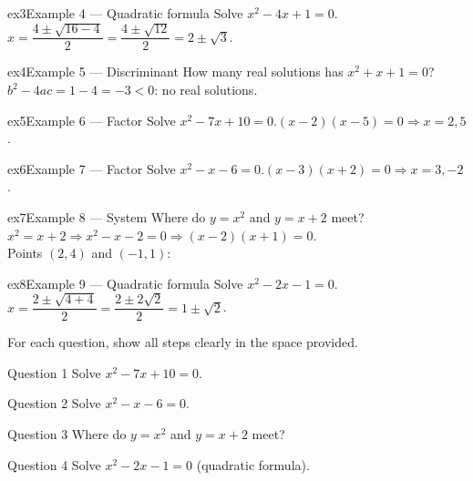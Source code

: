 \documentclass[11pt]{article}
\begin{document}
\begin{example}{ex3}{Example 4 --- Quadratic formula}
Solve $x^2-4x+1=0$.\soln $x=\dfrac{4\pm\sqrt{16-4}}{2}=\dfrac{4\pm\sqrt{12}}{2}=2\pm\sqrt3$.
\end{example}

\begin{example}{ex4}{Example 5 --- Discriminant}
How many real solutions has $x^2+x+1=0$?\soln $b^2-4ac=1-4=-3<0$: no real solutions.
\end{example}

\begin{example}{ex5}{Example 6 --- Factor}
Solve $x^2-7x+10=0$.\soln $(x-2)(x-5)=0\Rightarrow x=2,5$.
\end{example}

\begin{example}{ex6}{Example 7 --- Factor}
Solve $x^2-x-6=0$.\soln $(x-3)(x+2)=0\Rightarrow x=3,-2$.
\end{example}

\begin{example}{ex7}{Example 8 --- System}
Where do $y=x^2$ and $y=x+2$ meet?\soln $x^2=x+2\Rightarrow x^2-x-2=0\Rightarrow(x-2)(x+1)=0$. \\ Points $(2,4)$ and $(-1,1)$:
\end{example}

\begin{example}{ex8}{Example 9 --- Quadratic formula}
Solve $x^2-2x-1=0$.\soln $x=\dfrac{2\pm\sqrt{4+4}}{2}=\dfrac{2\pm2\sqrt2}{2}=1\pm\sqrt2$.
\end{example}

\clearpage
{}
For each question, show all steps clearly in the space provided.

\begin{qbox}{Question 1}
Solve $x^2-7x+10=0$.\workspace{2.4cm}
\end{qbox}

\begin{qbox}{Question 2}
Solve $x^2-x-6=0$.\workspace{2.4cm}
\end{qbox}

\begin{qbox}{Question 3}
Where do $y=x^2$ and $y=x+2$ meet?\workspace{2.4cm}
\end{qbox}

\begin{qbox}{Question 4}
Solve $x^2-2x-1=0$ (quadratic formula).\workspace{2.4cm}
\end{qbox}
\end{document}

